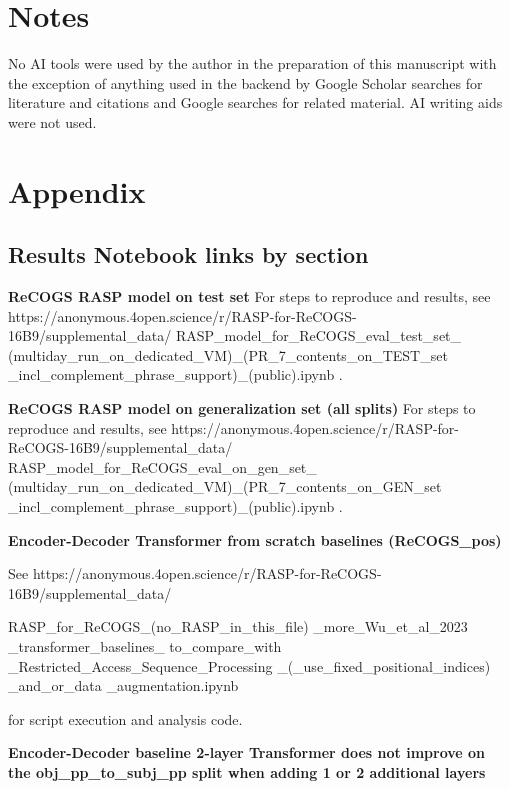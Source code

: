 \documentclass[11pt]{article}
\begin{document}


\section*{Notes}
No AI tools were used by the author in the preparation of this manuscript with the exception of anything used in the backend by Google Scholar searches for literature and citations and Google searches for related material. AI writing aids were not used.
\clearpage

\section{Appendix}

\subsection{Results Notebook links by section}
\label{results_notebook_links_by_section}

\textbf{ReCOGS RASP model on test set}
For steps to reproduce and results, see https://anonymous.4open.science/r/RASP-for-ReCOGS-16B9/supplemental\_data/
RASP\_model\_for\_ReCOGS\_eval\_test\_set\_
(multiday\_run\_on\_dedicated\_VM)\_(PR\_7\_contents\_on\_TEST\_set
\_incl\_complement\_phrase\_support)\_(public).ipynb .

\textbf{ReCOGS RASP model on generalization set (all splits)}
For steps to reproduce and results, see https://anonymous.4open.science/r/RASP-for-ReCOGS-16B9/supplemental\_data/
RASP\_model\_for\_ReCOGS\_eval\_on\_gen\_set\_
(multiday\_run\_on\_dedicated\_VM)\_(PR\_7\_contents\_on\_GEN\_set
\_incl\_complement\_phrase\_support)\_(public).ipynb .

\textbf{\cite{Wu2023} Encoder-Decoder Transformer from scratch baselines (ReCOGS\_pos)}

See https://anonymous.4open.science/r/RASP-for-ReCOGS-16B9/supplemental\_data/

RASP\_for\_ReCOGS\_(no\_RASP\_in\_this\_file)
\_more\_Wu\_et\_al\_2023
\_transformer\_baselines\_
to\_compare\_with
\_Restricted\_Access\_Sequence\_Processing
\_(\_use\_fixed\_positional\_indices)
\_and\_or\_data
\_augmentation.ipynb

for \cite{Wu2023} script execution and analysis code.

\textbf{\cite{Wu2023} Encoder-Decoder baseline 2-layer Transformer does not improve on the obj\_pp\_to\_subj\_pp split when adding 1 or 2 additional layers}
\end{document}
